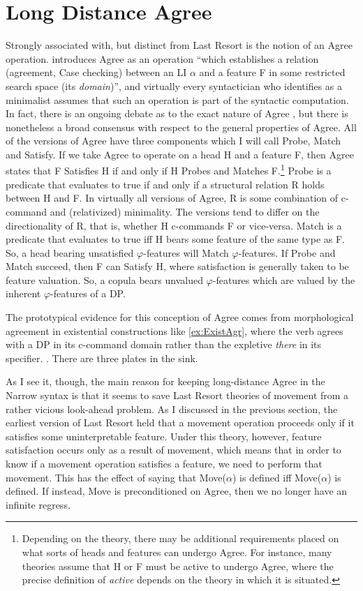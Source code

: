 \section{Long Distance Agree}
Strongly associated with, but distinct from Last Resort is the notion of an Agree operation.
\textcite[101]{chomsky2000minimalist} introduces Agree as an operation ``which establishes a relation (agreement, Case checking) between an LI $\alpha$ and a feature F in some restricted search space (its \textit{domain})'', and virtually every syntactician who identifies as a minimalist assumes that such an operation is part of the syntactic computation.
In fact, there is an ongoing debate as to the exact nature of Agree \parencite{zeijlstra2012there,preminger2013thats,bjorkman2014upward}, but there is nonetheless a broad consensus with respect to the general properties of Agree.
All of the versions of Agree have three components which I will call Probe, Match and Satisfy.
If we take Agree to operate on a head H and a feature F, then Agree states that F Satisfies H if and only if H Probes and Matches F.\footnote{
	Depending on the theory, there may be additional requirements placed on what sorts of heads and features can undergo Agree.
	For instance, many theories assume that H or F must be active to undergo Agree, where the precise definition of \textit{active} depends on the theory in which it is situated.  
}
Probe is a predicate that evaluates to true if and only if a structural relation R holds between H and F.
In virtually all versions of Agree, R is some combination of c-command and (relativized) minimality.
The versions tend to differ on the directionality of R, that is, whether H c-commands F or vice-versa.
Match is a predicate that evaluates to true iff H bears some feature of the same type as F.
So, a head bearing unsatisfied $\varphi$-features will Match $\varphi$-features.
If Probe and Match succeed, then F can Satisfy H, where satisfaction is generally taken to be feature valuation.
So, a copula bears unvalued $\varphi$-features which are valued by the inherent $\varphi$-features of a DP.

The prototypical evidence for this conception of Agree comes from morphological agreement in existential constructions like \cref{ex:ExistAgr}, where the verb agrees with a DP in its c-command domain rather than the expletive \textit{there} in its specifier.
\ex.\label{ex:ExistAgr} There are three plates in the sink.

As I see it, though, the main reason for keeping long-distance Agree in the Narrow syntax is that it seems to save Last Resort theories of movement from a rather vicious look-ahead problem.
As I discussed in the previous section, the earliest version of Last Resort held that a movement operation proceeds only if it satisfies some uninterpretable feature.
Under this theory, however, feature satisfaction occurs only as a result of movement, which means that in order to know if a movement operation satisfies a feature, we need to perform that movement.
This has the effect of saying that Move($\alpha$) is defined iff Move($\alpha$) is defined.
If instead, Move is preconditioned on Agree, then we no longer have an infinite regress.

